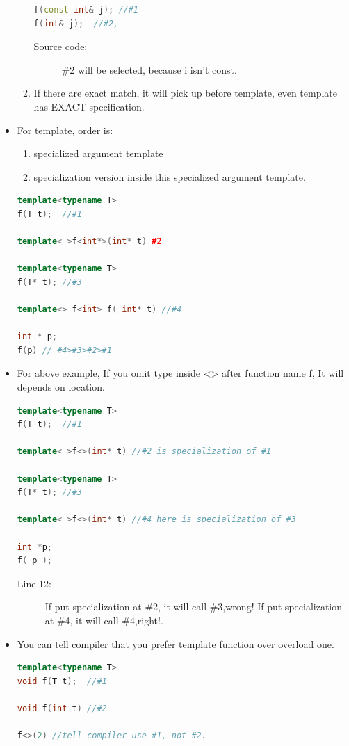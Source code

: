 \documentclass[a4paper,11pt,twoside]{book}
\begin{document}
\begin{itemize}
\begin{enumerate}
\begin{lstlisting}[frame=single, language=c++]
f(const int& j); //#1
f(int& j);  //#2, 
\end{lstlisting}
\begin{description}
	\item[Source code:] \#2 will be selected, because i isn't const.
\end{description}
		\item If there are exact match, it will pick up before template, even template has EXACT specification.
\end{enumerate}

	\item For template, order is:
	\begin{enumerate}
		\item specialized argument template
		\item specialization version inside this specialized argument template.
	\end{enumerate}
\begin{lstlisting}[frame=single, language=c++]
template<typename T>
f(T t);  //#1

template< >f<int*>(int* t) #2

template<typename T>
f(T* t); //#3

template<> f<int> f( int* t) //#4

int * p;
f(p) // #4>#3>#2>#1
\end{lstlisting}

\item For above example, If you omit type inside <> after function name f, It will depends on location.
\begin{lstlisting}[frame=single, language=c++]
template<typename T>
f(T t);  //#1

template< >f<>(int* t) //#2 is specialization of #1

template<typename T>
f(T* t); //#3

template< >f<>(int* t) //#4 here is specialization of #3

int *p; 
f( p ); 
\end{lstlisting}
\begin{description}
	\item[Line 12:] If put specialization at \#2, it will call \#3,wrong! If put specialization at \#4, it will call \#4,right!.
\end{description}

\item You can tell compiler that you prefer template function over overload one.

\begin{lstlisting}[frame=single, language=c++]
template<typename T>
void f(T t);  //#1

void f(int t) //#2

f<>(2) //tell compiler use #1, not #2.
\end{lstlisting}

\end{itemize}
\end{document}
